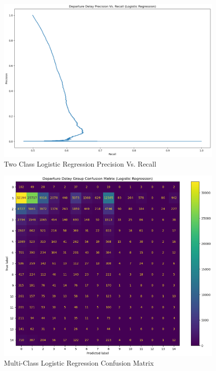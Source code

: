 \documentclass[a4paper,12pt]{article}
\begin{document}
\begin{figure}[!]
    \centering
    \includegraphics*[scale=.45]{../../img/model_rq2_prec_recall.png}
    \caption[]{Two Class Logistic Regression Precision Vs. Recall}
    \label{fig:model:rq2:prec_recall}
\end{figure}

\begin{figure}[!]
    \centering
    \includegraphics*[scale=.50]{../../img/model_rq2_cfmtrx_2.png}
    \caption[]{Multi-Class Logistic Regression Confusion Matrix}
    \label{fig:model:rq2:cfmtrx_2}
\end{figure}
\end{document}
